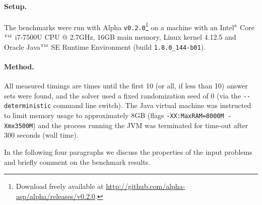 \documentclass[final]{vutinfth} %
\begin{document}
\paragraph{Setup.} The benchmarks were run with Alpha \texttt{v0.2.0}\footnote{Download freely available at \url{http://github.com/alpha-asp/alpha/releases/v0.2.0}.} on a machine with an Intel$^{\text{\tiny{\textregistered}}}$ Core$^{\text{\tiny{TM}}}$ i7-7500U CPU @ 2.7GHz, 16GB main memory, Linux kernel 4.12.5 and Oracle Java$^{\text{\tiny{TM}}}$ SE Runtime Environment (build \texttt{1.8.0\_144-b01}).

\paragraph{Method.} All measured timings are times until the first 10 (or all, if less than 10) answer sets were found, and the solver used a fixed randomization seed of 0 (via the \texttt{-{}-deterministic} command line switch). The Java virtual machine was instructed to limit memory usage to approximately 8GB (flags \texttt{-XX:MaxRAM=8000M -Xmx3500M}) and the process running the JVM was terminated for time-out after 300 seconds (wall time).

In the following four paragraphs we discuss the properties of the input problems and briefly comment on the benchmark results.
\end{document}
